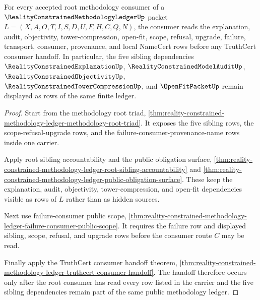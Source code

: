 \begin{theorem}
\label{thm:reality-constrained-methodology-ledger-root-dependency-totality}
For every accepted root methodology consumer of a
$\RealityConstrainedMethodologyLedgerUp$ packet
$L=(X,A,O,T,I,S,D,U,F,H,C,Q,N)$, the consumer reads the explanation, audit,
objectivity, tower-compression, open-fit, scope, refusal, upgrade, failure,
transport, consumer, provenance, and local NameCert rows before any TruthCert
consumer handoff. In particular, the five sibling dependencies
$\RealityConstrainedExplanationUp$, $\RealityConstrainedModelAuditUp$,
$\RealityConstrainedObjectivityUp$, $\RealityConstrainedTowerCompressionUp$,
and $\OpenFitPacketUp$ remain displayed as rows of the same finite ledger.
\end{theorem}
\begin{proof}
Start from the methodology root triad,
\autoref{thm:reality-constrained-methodology-ledger-methodology-root-triad}.
It exposes the five sibling rows, the scope-refusal-upgrade rows, and the
failure-consumer-provenance-name rows inside one carrier.

Apply root sibling accountability and the public obligation surface,
\autoref{thm:reality-constrained-methodology-ledger-root-sibling-accountability}
and
\autoref{thm:reality-constrained-methodology-ledger-public-obligation-surface}.
These keep the explanation, audit, objectivity, tower-compression, and
open-fit dependencies visible as rows of $L$ rather than as hidden sources.

Next use failure-consumer public scope,
\autoref{thm:reality-constrained-methodology-ledger-failure-consumer-public-scope}.
It requires the failure row and displayed sibling, scope, refusal, and upgrade
rows before the consumer route $C$ may be read.

Finally apply the TruthCert consumer handoff theorem,
\autoref{thm:reality-constrained-methodology-ledger-truthcert-consumer-handoff}.
The handoff therefore occurs only after the root consumer has read every row
listed in the carrier and the five sibling dependencies remain part of the
same public methodology ledger.
\end{proof}
